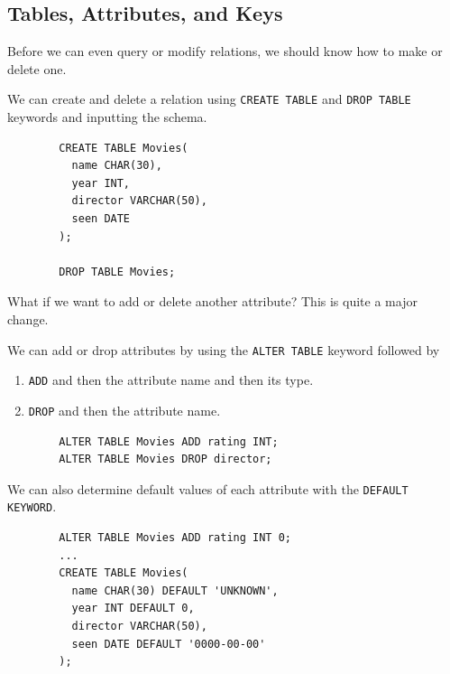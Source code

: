 \documentclass{article}
\begin{document}
  \subsection{Tables, Attributes, and Keys}

    Before we can even query or modify relations, we should know how to make or delete one. 

    \begin{theorem}
      We can create and delete a relation using \texttt{CREATE TABLE} and \texttt{DROP TABLE} keywords and inputting the schema. 
      \begin{lstlisting}
        CREATE TABLE Movies(
          name CHAR(30), 
          year INT, 
          director VARCHAR(50), 
          seen DATE
        ); 

        DROP TABLE Movies; 
      \end{lstlisting}
    \end{theorem}

    What if we want to add or delete another attribute? This is quite a major change. 

    \begin{theorem}
      We can add or drop attributes by using the \texttt{ALTER TABLE} keyword followed by 
      \begin{enumerate}
        \item \texttt{ADD} and then the attribute name and then its type. 
        \item \texttt{DROP} and then the attribute name. 
      \end{enumerate}
      \begin{lstlisting}
        ALTER TABLE Movies ADD rating INT; 
        ALTER TABLE Movies DROP director; 
      \end{lstlisting}
    \end{theorem}

    \begin{theorem}
      We can also determine default values of each attribute with the \texttt{DEFAULT KEYWORD}. 
      \begin{lstlisting}
        ALTER TABLE Movies ADD rating INT 0; 
        ...
        CREATE TABLE Movies(
          name CHAR(30) DEFAULT 'UNKNOWN', 
          year INT DEFAULT 0, 
          director VARCHAR(50), 
          seen DATE DEFAULT '0000-00-00'
        ); 
      \end{lstlisting}
      
    \end{theorem}
\end{document}
